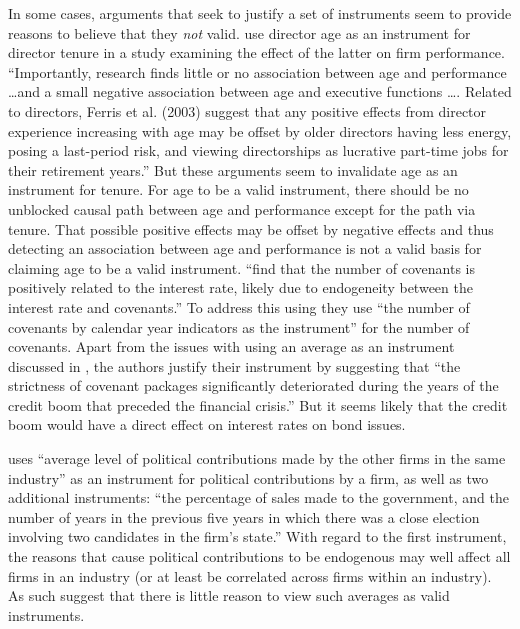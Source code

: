 In some cases, arguments that seek to justify a set of instruments seem to provide reasons to believe that they \emph{not} valid. \citet{Kim:2014fm} use director age as an instrument for director tenure in a study examining the effect of the latter on firm performance. 
``Importantly, research finds little or no association between age and performance \dots and a small negative association between age and executive functions \dots. 
Related to directors, Ferris et al. (2003) suggest that any positive effects from director experience increasing with age may be offset by older directors having less energy, posing a last-period risk, and viewing directorships as lucrative part-time jobs for their retirement years.'' 
But these arguments seem to invalidate age as an instrument for tenure. 
For age to be a valid instrument, there should be no unblocked causal path between age and performance except for the path via tenure.
 That possible positive effects may be offset by negative effects and thus detecting an association between age and performance is not a valid basis for claiming age to be a valid instrument. \citet{deFranco:2014ct} ``find that the number of covenants is positively related to the interest rate, likely due to endogeneity between the interest rate and covenants.'' To address this using they use ``the number of covenants by calendar year indicators as the instrument'' for the number of covenants. Apart from the issues with using an average as an instrument discussed in \citet{Reiss:2007ej}, the authors justify their instrument by suggesting that ``the strictness of covenant packages significantly deteriorated during the years of the credit boom that preceded the financial crisis.'' But it seems likely that the credit boom would have a direct effect on interest rates on bond issues. 
 
\citet{Correia:2014fp} uses ``average level of political contributions made by the other firms in the same industry'' as an instrument for political contributions by a firm, as well as two additional instruments: ``the percentage of sales made to the government, and the number of years in the previous five years in which there was a close election involving two candidates in the firm's state.'' With regard to the first instrument, the reasons that cause political contributions to be endogenous may well affect all firms in an industry (or at least be correlated across firms within an industry). 
As such \citet{Reiss:2007ej} suggest that there is little reason to view such averages as valid instruments.

